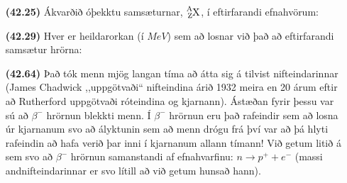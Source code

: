 \begin{enumerate}[label = \textbf{(\alph*)}]

\item[\textbf{(42.25)}] Ákvarðið óþekktu samsæturnar, $\ce{^{A}_{Z}X}$, í eftirfarandi efnahvörum: \\


\phantom{.}


\item[\textbf{(42.29)}] Hver er heildarorkan (í $\si{MeV}$) sem að losnar við það að eftirfarandi samsætur hrörna: 

\item[\textbf{(42.64)}] Það tók menn mjög langan tíma að átta sig á tilvist nifteindarinnar (James Chadwick ,,uppgötvaði`` nifteindina árið 1932 meira en 20 árum eftir að Rutherford uppgötvaði róteindina og kjarnann). Ástæðan fyrir þessu var sú að $\beta^-$ hrörnun blekkti menn. Í $\beta^-$ hrörnun eru það rafeindir sem að losna úr kjarnanum svo að ályktunin sem að menn drógu frá því var að þá hlyti rafeindin að hafa verið þar inni í kjarnanum allann tímann! Við getum litið á sem svo að $\beta^-$ hrörnun samanstandi af efnahvarfinu: $n \to p^+ + e^-$ (massi andnifteindarinnar er svo lítill að við getum hunsað hann). 


\end{enumerate}
